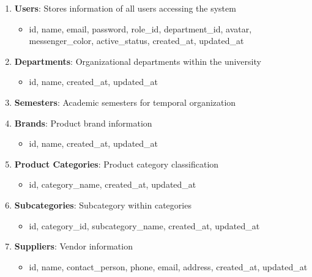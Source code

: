 \begin{enumerate}
    \item \textbf{Users}: Stores information of all users accessing the system
    \begin{itemize}
        \item id, name, email, password, role\_id, department\_id, avatar, messenger\_color, active\_status, created\_at, updated\_at
    \end{itemize}

    \item \textbf{Departments}: Organizational departments within the university
    \begin{itemize}
        \item id, name, created\_at, updated\_at
    \end{itemize}

    \item \textbf{Semesters}: Academic semesters for temporal organization
    \begin{itemize}
}
        \item id, name, created\_at, updated\_at
    \end{itemize}

    \item \textbf{Brands}: Product brand information
    \begin{itemize}
        \item id, name, created\_at, updated\_at
    \end{itemize}

    \item \textbf{Product Categories}: Product category classification
    \begin{itemize}
        \item id, category\_name, created\_at, updated\_at
    \end{itemize}

    \item \textbf{Subcategories}: Subcategory within categories
    \begin{itemize}
        \item id, category\_id, subcategory\_name, created\_at, updated\_at
    \end{itemize}

    \item \textbf{Suppliers}: Vendor information
    \begin{itemize}
        \item id, name, contact\_person, phone, email, address, created\_at, updated\_at
    \end{itemize}


\end{enumerate}
